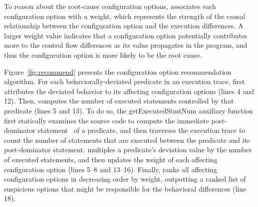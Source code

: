 To reason about the root-cause configuration options,
\ourtool associates each
configuration option with a weight, which represents the strength of
the causal relationship between the configuration option
and the execution differences.
A larger weight value indicates that a configuration option
potentially contributes more to the control
flow differences as its value propagates in the program, and thus
the configuration option is more likely to be the root cause.

Figure~\ref{fig:recommend} presents the configuration option
recommendation algorithm.
For each behaviorally-deviated predicate in an execution trace,
\ourtool first attributes the deviated behavior
to its affecting configuration options (lines 4 and 12). Then,
\ourtool computes the number of executed statements controlled
by that predicate (lines 5 and 13). To do so, 
the getExecutedStmtNum auxiliary function first statically examines the
source code to compute the immediate post-dominator statement~\cite{Torczon:2007:EC}
of a predicate, and then traverses the execution trace to count
the number of statements that
are executed between the predicate and its post-dominator
statement. 
\ourtool multiples a predicate's deviation value 
by the number of executed statements, and then updates the
weight of each affecting configuration option (lines 5--8
and 13--16).
Finally, \ourtool ranks all affecting configuration options
in decreasing order by weight, outputting a ranked list of suspicious
options that might be responsible for the
behavioral differences (line 18). 

